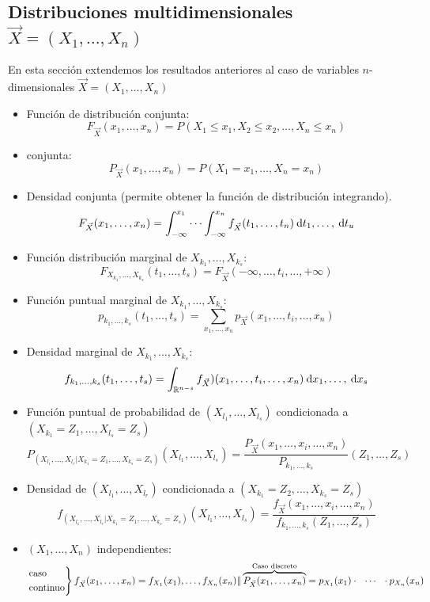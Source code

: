 \subsection{Distribuciones multidimensionales $\overset{\to}{X}=(X_1,\dots,X_n)$}

En esta sección extendemos los resultados anteriores al caso de variables $n$-dimensionales $\vec{X}=(X_1,\dots,X_n)$
\begin{itemize}
	\item Función de distribución conjunta: \[ F_{\vec{X}}(x_1,\dots,x_n)=P(X_1\le x_1,X_2\le x_2,\dots,X_n\le x_n) \]
	\item \Fpp conjunta: \[ P_{\vec{X}}(x_1,\dots,x_n)=P(X_1=x_1,\dots,X_n=x_n) \]
	\item Densidad conjunta (permite obtener la función de distribución integrando). \[ F_{\vec{X}}(x_1,\dots,x_n)=\int_{-\infty}^{x_1}\cdots\int_{-\infty}^{x_n}f_{\vec{X}}(t_1,\dots,t_n)\:\mathrm{d}t_1,\dots,\:\mathrm{d}t_u \]
	\item Función distribución marginal de $X_{k_1},\dots,X_{k_s}$:\[ F_{X_{k_1},\dots,X_{k_s}}(t_1,\dots,t_s)=F_{\vec{X}}(-\infty,\dots,t_i,\dots,+\infty) \]
	\item Función puntual marginal de $X_{k_1},\dots,X_{k_s}$: \[ p_{k_1,\dots,k_s}(t_1,\dots,t_s)=\sum_{x_1,\dots,x_n}p_{\vec{X}}(x_1,\dots,t_i,\dots,x_n) \]
	\item Densidad marginal de $X_{k_1},\dots,X_{k_s}$: \[ f_{k_1,\dots,k_s}(t_1,\dots,t_s)=\int_{\operatorname{\mathbb{R}}^{n-s}}f_{\vec{X}})(x_1,\dots,t_i,\dots,x_n)\:\mathrm{d}x_1,\dots,\:\mathrm{d}x_s \]
	\item Función puntual de probabilidad de $\left(X_{l_1},\dots,X_{l_s}\right)$ condicionada a $\left(X_{k_1}=Z_1,\dots,X_{l_s}=Z_s\right)$ \[ P_{\left(X_{l_1},\dots,X_{l_r}|X_{k_1}=Z_1,\dots,X_{k_s}=Z_s\right)}\left(X_{l_1},\dots,X_{l_s}\right)=\dfrac{P_{\vec{X}}(x_1,\dots,x_i,\dots,x_n)}{P_{k_1,\dots,k_s}}(Z_1,\dots,Z_s) \]
	\item Densidad de $\left(X_{l_1},\dots,X_{l_r}\right)$ condicionada a $\left(X_{k_1}=Z_2,\dots,X_{k_s}=Z_s\right)$ \[ f_{\left(X_{l_1},\dots,X_{l_r}|X_{k_1}=Z_1,\dots,X_{k_s}=Z_s\right)}\left(X_{l_1},\dots,X_{l_s}\right)=\dfrac{f_{\vec{X}}(x_1,\dots,x_i,\dots,x_n)}{f_{k_1,\dots,k_s}(Z_1,\dots,Z_s)}\]
	\item $(X_1,\dots,X_n)$ independientes: \[ \begin{rcases}
		\text{caso}\\
		\text{continuo}
	\end{rcases}f_{\vec{X}}(x_1,\dots,x_n)=f_{X_1}(x_1),\dots,f_{X_n}(x_n)\| \overbrace{P_{\vec{X}}(x_1,\dots,x_n)}^{\text{Caso discreto}}=p_{X_1}(x_1)\cdot~~\cdots~~\cdot p_{X_n}(x_n) \]
\end{itemize}
